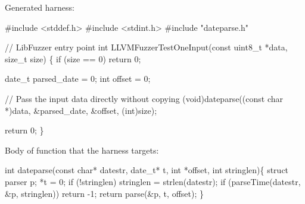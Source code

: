 \documentclass[
  a4paper,
]{scrreprt}
\newenvironment{Shaded}{\begin{snugshade}}{\end{snugshade}}
\newcommand{\CommentTok}[1]{\textcolor[rgb]{0.41,0.41,0.41}{#1}}
\newcommand{\ControlFlowTok}[1]{\textcolor[rgb]{0.85,0.12,0.09}{#1}}
\newcommand{\DataTypeTok}[1]{\textcolor[rgb]{0.47,0.16,0.63}{#1}}
\newcommand{\DecValTok}[1]{\textcolor[rgb]{0.47,0.16,0.63}{#1}}
\newcommand{\ImportTok}[1]{\textcolor[rgb]{0.33,0.33,0.33}{#1}}
\newcommand{\KeywordTok}[1]{\textcolor[rgb]{0.85,0.12,0.09}{#1}}
\newcommand{\NormalTok}[1]{\textcolor[rgb]{0.33,0.33,0.33}{#1}}
\newcommand{\OperatorTok}[1]{\textcolor[rgb]{0.00,0.46,0.62}{#1}}
\newcommand{\PreprocessorTok}[1]{\textcolor[rgb]{0.47,0.16,0.63}{#1}}
\theoremstyle{definition}
\theoremstyle{remark}
\begin{document}
Generated harness:

\begin{Shaded}
\begin{Highlighting}[numbers=left,,]
\PreprocessorTok{\#include }\ImportTok{\textless{}stddef.h\textgreater{}}
\PreprocessorTok{\#include }\ImportTok{\textless{}stdint.h\textgreater{}}
\PreprocessorTok{\#include }\ImportTok{"dateparse.h"}

\CommentTok{// LibFuzzer entry point}
\DataTypeTok{int}\NormalTok{ LLVMFuzzerTestOneInput}\OperatorTok{(}\DataTypeTok{const} \DataTypeTok{uint8\_t} \OperatorTok{*}\NormalTok{data}\OperatorTok{,} \DataTypeTok{size\_t}\NormalTok{ size}\OperatorTok{)} \OperatorTok{\{}
    \ControlFlowTok{if} \OperatorTok{(}\NormalTok{size }\OperatorTok{==} \DecValTok{0}\OperatorTok{)} \ControlFlowTok{return} \DecValTok{0}\OperatorTok{;}

\NormalTok{    date\_t parsed\_date }\OperatorTok{=} \DecValTok{0}\OperatorTok{;}
    \DataTypeTok{int}\NormalTok{ offset }\OperatorTok{=} \DecValTok{0}\OperatorTok{;}

    \CommentTok{// Pass the input data directly without copying}
    \OperatorTok{(}\DataTypeTok{void}\OperatorTok{)}\NormalTok{dateparse}\OperatorTok{((}\DataTypeTok{const} \DataTypeTok{char} \OperatorTok{*)}\NormalTok{data}\OperatorTok{,} \OperatorTok{\&}\NormalTok{parsed\_date}\OperatorTok{,} \OperatorTok{\&}\NormalTok{offset}\OperatorTok{,} \OperatorTok{(}\DataTypeTok{int}\OperatorTok{)}\NormalTok{size}\OperatorTok{);}

    \ControlFlowTok{return} \DecValTok{0}\OperatorTok{;}
\OperatorTok{\}}
\end{Highlighting}
\end{Shaded}

Body of function that the harness targets:

\begin{Shaded}
\begin{Highlighting}[numbers=left,,]
\DataTypeTok{int}\NormalTok{ dateparse}\OperatorTok{(}\DataTypeTok{const} \DataTypeTok{char}\OperatorTok{*}\NormalTok{ datestr}\OperatorTok{,}\NormalTok{ date\_t}\OperatorTok{*}\NormalTok{ t}\OperatorTok{,} \DataTypeTok{int} \OperatorTok{*}\NormalTok{offset}\OperatorTok{,} \DataTypeTok{int}\NormalTok{ stringlen}\OperatorTok{)\{}
    \KeywordTok{struct}\NormalTok{ parser p}\OperatorTok{;}
    \OperatorTok{*}\NormalTok{t }\OperatorTok{=} \DecValTok{0}\OperatorTok{;}
    \ControlFlowTok{if} \OperatorTok{(!}\NormalTok{stringlen}\OperatorTok{)}
\NormalTok{        stringlen }\OperatorTok{=}\NormalTok{ strlen}\OperatorTok{(}\NormalTok{datestr}\OperatorTok{);}
    \ControlFlowTok{if} \OperatorTok{(}\NormalTok{parseTime}\OperatorTok{(}\NormalTok{datestr}\OperatorTok{,} \OperatorTok{\&}\NormalTok{p}\OperatorTok{,}\NormalTok{ stringlen}\OperatorTok{))}
        \ControlFlowTok{return} \OperatorTok{{-}}\DecValTok{1}\OperatorTok{;}
    \ControlFlowTok{return}\NormalTok{ parse}\OperatorTok{(\&}\NormalTok{p}\OperatorTok{,}\NormalTok{ t}\OperatorTok{,}\NormalTok{ offset}\OperatorTok{);}
\OperatorTok{\}}
\end{Highlighting}
\end{Shaded}
\end{document}
